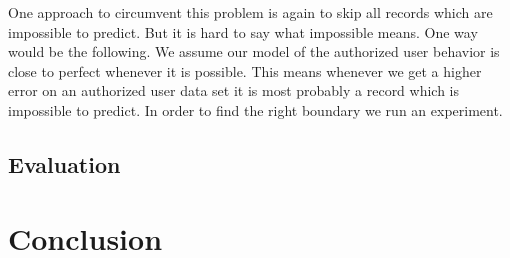 \documentclass[conference]{IEEEtran}
\begin{document}
One approach to circumvent this problem is again to skip all records which are impossible to predict. But it is hard to say what impossible means. One way would be the following. We assume our model of the authorized user behavior is close to perfect whenever it is possible. This means whenever we get a higher error on an authorized user data set it is most probably a record which is impossible to predict. In order to find the right boundary we run an experiment.


\subsection{Evaluation}


\section{Conclusion}


%
%



%
%
\end{document}
